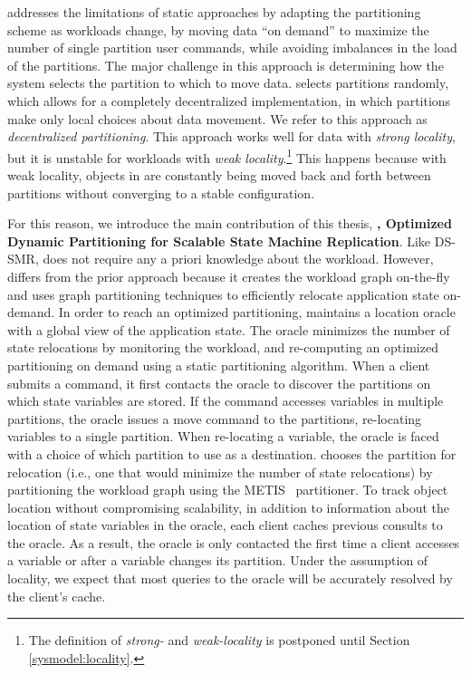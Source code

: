 \dssmr{} addresses the limitations of static approaches by adapting the partitioning
scheme as workloads change, by moving data ``on demand'' to maximize the number
of single partition user commands, while avoiding imbalances in the load of the
partitions. The major challenge in this approach is determining how the system
selects the partition to which to move data. \dssmr{} selects partitions
randomly, which allows for a completely decentralized implementation, in which
partitions make only local choices about data movement. We refer to this
approach as \emph{decentralized partitioning}. This approach works well for data
with \emph{strong locality}, but it is unstable for workloads with \emph{weak
locality}.\footnote{The definition of \emph{strong-} and \emph{weak-locality} is
postponed until Section \ref{sysmodel:locality}.} This happens because with
weak locality, objects in \dssmr{} are constantly being moved back and forth
between partitions without converging to a stable configuration.

For this reason, we introduce the main contribution of this thesis,
\textbf{\dynastar, Optimized Dynamic Partitioning for Scalable State Machine
Replication}. Like DS-SMR, \dynastar does not require any a priori knowledge
about the workload. However, \dynastar differs from the prior approach because
it creates the workload graph on-the-fly and uses graph partitioning techniques
to efficiently relocate application state on-demand. In order to reach an
optimized partitioning,  \dynastar maintains a location oracle with a global
view of the application state. The oracle minimizes the number of state
relocations by monitoring the workload, and re-computing an optimized
partitioning on demand using a static partitioning algorithm. 
When a client submits a command, it first contacts the oracle to discover the partitions on
which state variables are stored. If the command accesses variables in multiple
partitions, the oracle issues a move command to the partitions, re-locating
variables to a single partition. When re-locating a variable, the oracle is
faced with a choice of which partition to use as a destination. \dynastar
chooses the partition for relocation (i.e., one that would minimize the number
of state relocations) by partitioning the workload graph using the
METIS~\cite{abou2006multilevel} partitioner. To track object location without
compromising scalability, in addition to information about the location of state
variables in the oracle, each client caches previous consults to the oracle. As
a result, the oracle is only contacted the first time a client accesses a
variable or after a variable changes its partition. Under the assumption of
locality, we expect that most queries to the oracle will be accurately resolved
by the client's cache.

